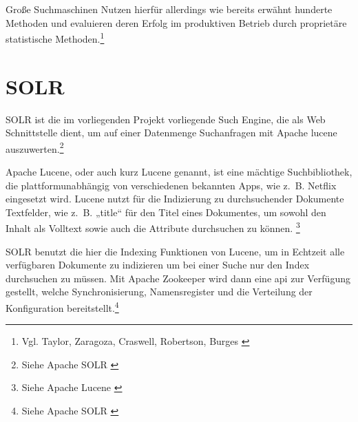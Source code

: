 Große Suchmaschinen Nutzen hierfür allerdings wie bereits erwähnt hunderte Methoden und evaluieren deren Erfolg im produktiven Betrieb durch proprietäre statistische Methoden.\footnote{Vgl. Taylor, Zaragoza, Craswell, Robertson, Burges \cite{taylor2006}}

\section{SOLR}
\label{sec:SOLR}
SOLR ist die im vorliegenden Projekt vorliegende Such Engine, die als Web Schnittstelle dient, um auf einer Datenmenge Suchanfragen mit Apache \gls{lucene} auszuwerten.\footnote{Siehe Apache SOLR \cite{solr2022}}

Apache Lucene, oder auch kurz Lucene genannt, ist eine mächtige Suchbibliothek, die plattformunabhängig von verschiedenen bekannten Apps, wie z. B. Netflix eingesetzt wird.
Lucene nutzt für die Indizierung zu durchsuchender Dokumente Textfelder, wie z. B. „title“ für den Titel eines Dokumentes, um sowohl den Inhalt als Volltext sowie auch die Attribute durchsuchen zu können. \footnote{Siehe Apache Lucene \cite{lucene2022}}

SOLR benutzt die hier die Indexing Funktionen von Lucene, um in Echtzeit alle verfügbaren Dokumente zu indizieren um bei einer Suche nur den Index durchsuchen zu müssen. Mit Apache Zookeeper wird dann eine \gls{api} zur Verfügung gestellt, welche Synchronisierung, Namensregister und die Verteilung der Konfiguration bereitstellt.\footnote{Siehe Apache SOLR \cite{solr2022}}
